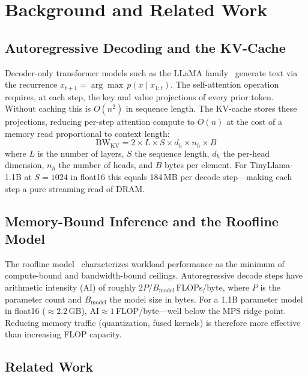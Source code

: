 \documentclass[conference]{IEEEtran}
\begin{document}
\section{Background and Related Work}

\subsection{Autoregressive Decoding and the KV-Cache}

Decoder-only transformer models such as the LLaMA family~\cite{touvron2023}
generate text via the recurrence $x_{t+1} = \arg\max\, p(x \mid x_{1:t})$.
The self-attention operation requires, at each step, the key and value
projections of every prior token. Without caching this is $O(n^2)$ in
sequence length. The KV-cache stores these projections, reducing per-step
attention compute to $O(n)$ at the cost of a memory read proportional to
context length:
\begin{equation}
  \mathrm{BW}_{\mathrm{KV}} = 2 \times L \times S \times d_h \times n_h \times B
\end{equation}
where $L$ is the number of layers, $S$ the sequence length, $d_h$ the
per-head dimension, $n_h$ the number of heads, and $B$ bytes per element.
For TinyLlama-1.1B at $S{=}1024$ in float16 this equals 184\,MB per
decode step---making each step a pure streaming read of DRAM.

\subsection{Memory-Bound Inference and the Roofline Model}

The roofline model~\cite{williams2009} characterizes workload performance
as the minimum of compute-bound and bandwidth-bound ceilings.
Autoregressive decode steps have arithmetic intensity (AI) of roughly
$2P / B_{\mathrm{model}}$\,FLOPs/byte, where $P$ is the parameter count
and $B_{\mathrm{model}}$ the model size in bytes. For a 1.1B parameter
model in float16 (${\approx}2.2$\,GB), $\mathrm{AI} \approx
1$\,FLOP/byte---well below the MPS ridge point. Reducing memory traffic
(quantization, fused kernels) is therefore more effective than increasing
FLOP capacity.

\subsection{Related Work}
\end{document}
